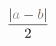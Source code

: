 \documentclass[preview]{standalone}
\begin{document}
\begin{align*}
\frac {|\textcolor[HTML]{888888}{a}-\textcolor[HTML]{736357}{b}|}{2}
\end{align*}
\end{document}
